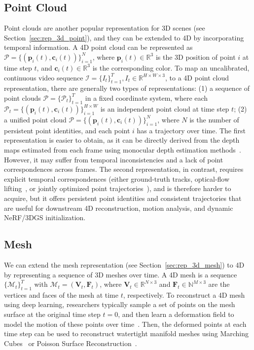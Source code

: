 \subsection{Point Cloud}
\label{sec:rep_4d_point}
Point clouds are another popular representation for 3D scenes (see Section~\ref{sec:rep_3d_point}), and they can be extended to 4D by incorporating temporal information.
A 4D point cloud can be represented as $\mathcal{P}=\{(\mathbf{p}_i(t), \mathbf{c}_i(t))\}_{i=1}^N$, where $\mathbf{p}_i(t) \in \mathbb{R}^3$
is the 3D position of point $i$ at time step $t$, and $\mathbf{c}_i(t) \in \mathbb{R}^3$ is the corresponding color.
To map an uncalibrated, continuous video sequence $\mathcal{I}=\{I_t\}_{t=1}^T, I_t\in \mathbb{R}^{H \times W \times 3}$, to a 4D point cloud representation, there are generally two types of representations:
(1) a sequence of point clouds $\mathcal{P}=\{\mathcal{P}_t\}_{t=1}^T$ in a fixed coordinate system, where each $\mathcal{P}_t=\{(\mathbf{p}_i(t), \mathbf{c}_i(t))\}_{i=1}^{H \times W}$ is an independent point cloud at time step $t$;
(2) a unified point cloud $\mathcal{P}=\{(\mathbf{p}_i(t), \mathbf{c}_i(t))\}_{i=1}^{N}$, where $N$ is the number of persistent point identities, and each point $i$ has a trajectory over time.
The first representation is easier to obtain, as it can be directly derived from the depth maps estimated from each frame using monocular depth estimation methods~\cite{li2025megasam}.
However, it may suffer from temporal inconsistencies and a lack of point correspondences across frames.
The second representation, in contrast, requires explicit temporal correspondences (either ground-truth tracks, optical-flow lifting~\cite{teed2020raft}, or jointly optimized point trajectories~\cite{li2025megasam}), and is therefore harder to acquire, but it offers persistent point identities and consistent trajectories that are useful for downstream 4D reconstruction, motion analysis, and dynamic NeRF/3DGS initialization.

\subsection{Mesh}
\label{sec:rep_4d_mesh}
We can extend the mesh representation (see Section~\ref{sec:rep_3d_mesh}) to 4D by representing a sequence of 3D meshes over time.
A 4D mesh is a sequence $\{\mathcal{M}_t\}_{t=1}^T$ with $\mathcal{M}_t = (\mathbf{V}_t, \mathbf{F}_t)$, where $\mathbf{V}_t \in \mathbb{R}^{N \times 3}$ and $\mathbf{F}_t \in \mathbb{N}^{M \times 3}$ are the vertices and faces of the mesh at time $t$, respectively.
To reconstruct a 4D mesh using deep learning, researchers typically sample a set of points on the mesh surface at the original time step $t=0$, and then learn a deformation field to model the motion of these points over time~\cite{cao2024motion2vecsets}.
Then, the deformed points at each time step can be used to reconstruct watertight manifold meshes using
Marching Cubes~\cite{lorensen1998marching} or Poisson Surface Reconstruction~\cite{kazhdan2006poisson}.









